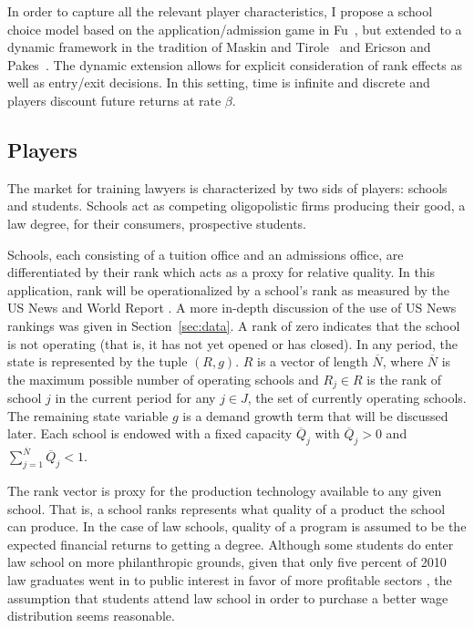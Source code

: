 \documentclass[12pt]{article}
\theoremstyle{definition}
\begin{document}
In order to capture all the relevant player characteristics, I propose a school choice model based on the application/admission game in Fu~\cite{Fu}, but extended to a dynamic framework in the tradition of Maskin and Tirole~\cite{MaskinTirole} and Ericson and Pakes~\cite{EricsonPakes}. The dynamic extension allows for explicit consideration of rank effects as well as entry/exit decisions. In this setting, time is infinite and discrete and players discount future returns at rate $\beta$.

\subsection{Players}
\label{sec:players}

The market for training lawyers is characterized by two sids of players: schools and students. Schools act as competing oligopolistic firms producing their good, a law degree, for their consumers, prospective students.

Schools, each consisting of a tuition office and an admissions office, are differentiated by their rank which acts as a proxy for relative quality. In this application, rank will be operationalized by a school's rank as measured by the US News and World Report \cite{USNews}. A more in-depth discussion of the use of US News rankings was given in Section~\ref{sec:data}. A rank of zero indicates that the school is not operating (that is, it has not yet opened or has closed). In any period, the state is represented by the tuple $(R, g)$. $R$ is a vector of length $\overline{N}$, where $\overline{N}$ is the maximum possible number of operating schools and $R_j\in R$ is the rank of school $j$ in the current period for any $j\in J$, the set of currently operating schools. The remaining state variable $g$ is a demand growth term that will be discussed later. Each school is endowed with a fixed capacity $\overline{Q}_j$ with $\overline{Q}_j > 0$ and $\sum_{j=1}^{\overline{N}}\overline{Q}_j < 1$.

The rank vector is proxy for the production technology available to any given school. That is, a school ranks represents what quality of a product the school can produce. In the case of law schools, quality of a program is assumed to be the expected financial returns to getting a degree. Although some students do enter law school on more philanthropic grounds, given that only five percent of 2010 law graduates went in to public interest in favor of more profitable sectors \cite{nalpSalaries}, the assumption that students attend law school in order to purchase a better wage distribution seems reasonable.
\end{document}
